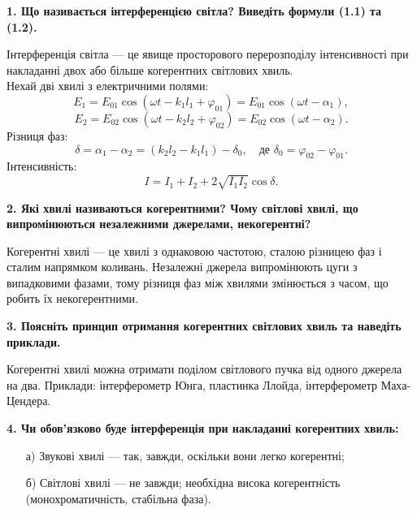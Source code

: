 \documentclass[12pt,a4paper]{article}
\begin{document}
    \setlength{\parindent}{0pt}

    \textbf{1. Що називається інтерференцією світла? Виведіть формули (1.1) та (1.2).}

    \setlength{\parindent}{1.5em}

    Інтерференція світла — це явище просторового перерозподілу інтенсивності при накладанні двох або більше когерентних світлових хвиль. \\
    Нехай дві хвилі з електричними полями:
    \[ E_1 = E_{01} \cos(\omega t - k_1 l_1 + \varphi_{01}) = E_{01} \cos(\omega t - \alpha_1), \]
    \[ E_2 = E_{02} \cos(\omega t - k_2 l_2 + \varphi_{02}) = E_{02} \cos(\omega t - \alpha_2). \]
    Різниця фаз:
    \[ \delta = \alpha_1 - \alpha_2 = (k_2 l_2 - k_1 l_1) - \delta_0, \quad \text{де } \delta_0 = \varphi_{02} - \varphi_{01}. \]
    Інтенсивність:
    \[ I = I_1 + I_2 + 2\sqrt{I_1 I_2} \cos \delta. \]
    
    \vspace{1em}
    \setlength{\parindent}{0pt}

    \textbf{2. Які хвилі називаються когерентними? Чому світлові хвилі, що випромінюються незалежними джерелами, некогерентні?}
    \setlength{\parindent}{1.5em}

    Когерентні хвилі — це хвилі з однаковою частотою, сталою різницею фаз і сталим напрямком коливань. Незалежні джерела випромінюють цуги з випадковими фазами, тому різниця фаз між хвилями змінюється з часом, що робить їх некогерентними.

    \vspace{1em}

    \setlength{\parindent}{0pt}

    \textbf{3. Поясніть принцип отримання когерентних світлових хвиль та наведіть приклади.}

    \setlength{\parindent}{1.5em}

    Когерентні хвилі можна отримати поділом світлового пучка від одного джерела на два. Приклади: інтерферометр Юнга, пластинка Ллойда, інтерферометр Маха-Цендера.

    \vspace{1em}

    \setlength{\parindent}{0pt}

    \textbf{4. Чи обов'язково буде інтерференція при накладанні когерентних хвиль:}

    \setlength{\parindent}{1.5em}

    \begin{itemize}
    \item[а)] Звукові хвилі — так, завжди, оскільки вони легко когерентні;
    \item[б)] Світлові хвилі — не завжди; необхідна висока когерентність (монохроматичність, стабільна фаза).
    \end{itemize}
\end{document}
